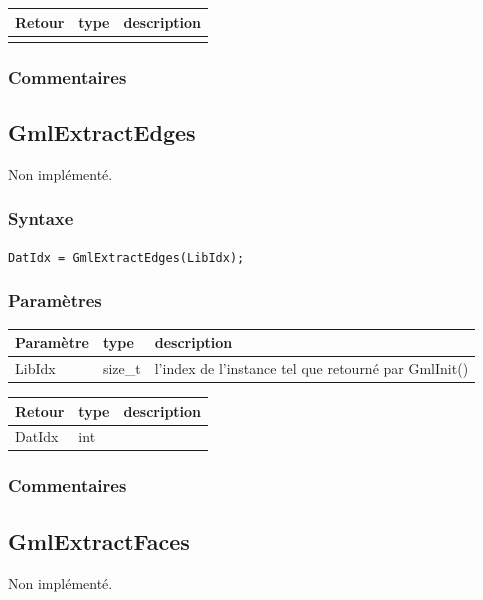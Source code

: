 \documentclass[a4paper,12pt]{article}
\begin{document}
\medskip

\begin{tabular}{|m{2cm}|m{1.5cm}|m{10.5cm}|}
\hline
Retour     & type   & description \\
\hline
 & & \\
\hline
\end{tabular}

\subsubsection*{Commentaires}


\subsection{GmlExtractEdges}
Non implémenté.

\subsubsection*{Syntaxe}

{\tt DatIdx = GmlExtractEdges(LibIdx);}

\subsubsection*{Paramètres}

\begin{tabular}{|m{2cm}|m{1.5cm}|m{10.5cm}|}
\hline
Paramètre  & type    & description \\
\hline
LibIdx     & size\_t & l'index de l'instance tel que retourné par GmlInit() \\
\hline
\end{tabular}

\medskip

\begin{tabular}{|m{2cm}|m{1.5cm}|m{10.5cm}|}
\hline
Retour     & type   & description \\
\hline
DatIdx     & int    & \\
\hline
\end{tabular}

\subsubsection*{Commentaires}


\subsection{GmlExtractFaces}
Non implémenté.
\end{document}
